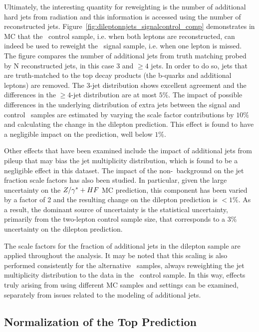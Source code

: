 Ultimately, the interesting quantity for reweighting is the number of
additional hard jets from radiation and this information is accessed using the
number of reconstructed
jets. Figure~\ref{fig:dileptonnjets_signalcontrol_comp} 
demonstrates in MC that the \ttll\ control sample, i.e. when both leptons are reconstructed,
can indeed be used to reweight the \ttll\ signal sample, i.e. when one lepton is missed.
The figure compares the
number of additional jets from truth matching probed by N
reconstructed jets, in this case 3 and $\ge4$ jets. In order to do so,
jets that are truth-matched to the top decay products (the b-quarks
and additional leptons) are removed. The 3-jet distribution shows 
excellent agreement and the differences in the $\ge4$-jet distribution 
are at most $5\%$. The impact of possible differences in the
underlying distribution of extra
jets between the signal and control \ttll\ samples are estimated by
varying the scale factor contributions by $10\%$ and calculating the
change in the dilepton prediction. This effect is found to have a
negligible impact on the prediction, well below $1\%$.

Other effects that have been examined include the impact of 
additional jets from pileup that may bias the jet multiplicity
distribution, which  is found to be a negligible effect in this dataset. The
impact of the non-\ttll\ background on the jet fraction scale factors
has also been studied. In particular, given the large uncertainty on
the $Z/\gamma^*+HF$ MC prediction, this component has been varied by a factor
of 2 and the resulting change on the dilepton prediction is $<1\%$. As
a result, the dominant source of uncertainty is the statistical
uncertainty, primarily from the two-lepton control sample size, that
corresponds to a $3\%$ uncertainty on the dilepton prediction. 

The scale factors for the fraction of additional jets in the dilepton
sample are applied throughout the analysis. It may be noted that this
scaling is also performed consistently for the alternative \ttbar\
samples, always reweighting the jet multiplicity distribution to the
data in the \ttll\ control sample. In this way, effects truly
arising from using different MC samples and settings can be examined,
separately from issues related to the modeling of additional jets. 

\subsection{Normalization of the Top Prediction}
\label{sec:topnorm}

